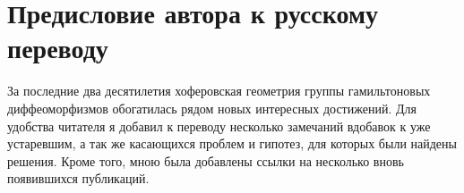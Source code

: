\chapter*{Предисловие автора к русскому переводу}
За последние два десятилетия хоферовская геометрия группы
гамильтоновых диффеоморфизмов обогатилась рядом новых интересных
достижений.
Для удобства читателя я добавил к переводу несколько замечаний
вдобавок к уже устаревшим, а так же касающихся проблем и гипотез, для
которых были найдены решения. Кроме того, мною была добавлены ссылки на
несколько вновь появившихся публикаций.
